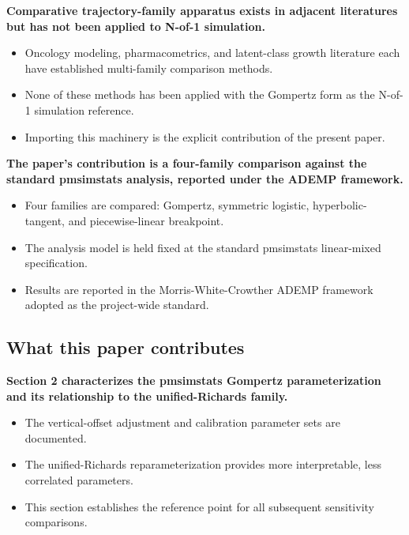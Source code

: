 \documentclass[
  11pt,
]{article}
\begin{document}
\textbf{Comparative trajectory-family apparatus exists in
adjacent literatures but has not been applied to N-of-1
simulation.}

\begin{itemize}\setlength{\itemsep}{2pt}\setlength{\parskip}{0pt}
\item Oncology modeling, pharmacometrics, and latent-class
  growth literature each have established multi-family
  comparison methods.
\item None of these methods has been applied with the Gompertz
  form as the N-of-1 simulation reference.
\item Importing this machinery is the explicit contribution of
  the present paper.
\end{itemize}

\textbf{The paper's contribution is a four-family comparison
against the standard pmsimstats analysis, reported under the
ADEMP framework.}

\begin{itemize}\setlength{\itemsep}{2pt}\setlength{\parskip}{0pt}
\item Four families are compared: Gompertz, symmetric logistic,
  hyperbolic-tangent, and piecewise-linear breakpoint.
\item The analysis model is held fixed at the standard
  pmsimstats linear-mixed specification.
\item Results are reported in the Morris-White-Crowther ADEMP
  framework adopted as the project-wide standard.
\end{itemize}

\subsection{What this paper contributes}\label{what-this-paper-contributes}

\textbf{Section 2 characterizes the pmsimstats Gompertz
parameterization and its relationship to the unified-Richards
family.}

\begin{itemize}\setlength{\itemsep}{2pt}\setlength{\parskip}{0pt}
\item The vertical-offset adjustment and calibration parameter
  sets are documented.
\item The unified-Richards reparameterization provides more
  interpretable, less correlated parameters.
\item This section establishes the reference point for all
  subsequent sensitivity comparisons.
\end{itemize}
\end{document}

